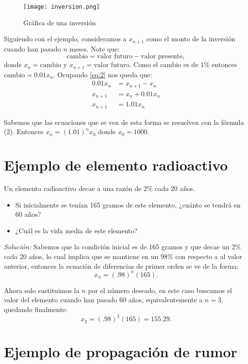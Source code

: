 \documentclass{report}
\begin{document}
\begin{figure}
  \centering
  \texttt{[image: inversion.png]}
  \caption{Gráfica de una inversión}
  \label{inversion}
\end{figure}

Siguiendo con el ejemplo, consideramos a $x_{n+1}$ como el monto
de la inversión cuando han pasado $n$ meses.  Note que:
\begin{equation}
  \label{eq:2}
  \text{cambio}=\text{valor futuro}-\text{valor presente},
\end{equation}
donde $x_n=\text{cambio}$ y $x_{n+1}=\text{valor futuro}$.  Como el
cambio es de $1\%$ entonces $\text{cambio}=0.01x_n$.  Ocupando
\eqref{eq:2} nos queda que:
\begin{align*}
  0.01x_n&=x_{n+1}-x_n\\
  x_{n+1}&=x_n+0.01x_n\\
 x_{n+1}&=1.01x_n
\end{align*}

Sabemos que las ecuaciones que se ven de esta forma se resuelven con
la fórmula (2).  Entonces $x_n=(1.01)^nx_0$ donde $x_0=1000$.

\section{Ejemplo de elemento radioactivo}

Un elemento radioactivo decae a una razón de $2\%$ cada 20 años.
\begin{itemize}
\item Si inicialmente se tenían 165 gramos de este elemento, ¿cuánto
  se tendrá en 60 años?
 \item ¿Cuál es la vida media de este elemento?
\end{itemize}

\textit{Solución:}  
Sabemos que la condición inicial es de 165 gramos y que decae un $2\%$
cada 20 años, lo cual implica que se mantiene en un $98\%$ con
respecto a al valor anterior, entonces la ecuación de diferencias de
primer orden se ve de la forma:
$$x_{n}=(.98)^n(165).$$

Ahora solo sustituimos la $n$ por el número deseado, en este caso
buscamos el valor del elemento cuando han pasado 60 años,
equivalentemente a $n=3$, quedando finalmente:
$$x_{3}=(.98)^3(165)= 155.29.$$

\section{Ejemplo de propagación de rumor}
\end{document}
